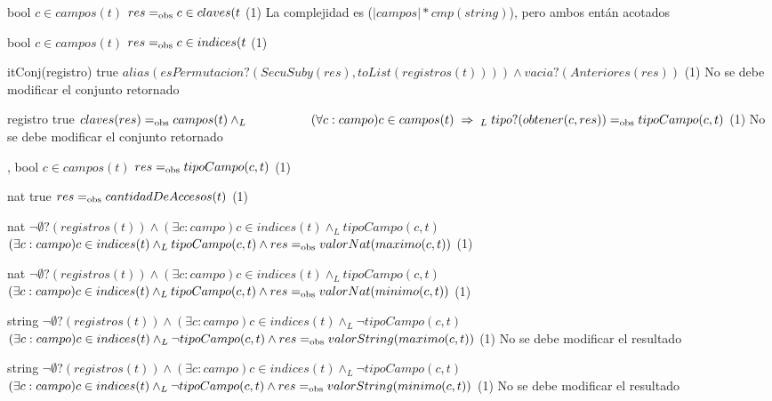 {   
    }
{bool}
{$c \in campos(t)$}
{$res =_{\mathrm{obs}} c \in claves(t$}
{\bigo(1)}
{}
{La complejidad es \bigo($|campos| * cmp(string)$), pero ambos entán acotados}

{   
    }
{bool}
{$c \in campos(t)$}
{$res =_{\mathrm{obs}} c \in indices(t$}
{\bigo(1)}
{}
{}

{   }
{itConj(registro)}
{true}
{$alias(esPermutacion?(SecuSuby(res), toList(registros(t)))) \land vacia?(Anteriores(res))$}
{\bigo(1)}
{No se debe modificar el conjunto retornado}
{}

{   }
{registro}
{true}
{$claves(res) \igobs campos(t) \land_L \\
    \hspace*{5em} (\forall c : campo) c \in campos(t) \implies_L \; tipo?(obtener(c,res)) \igobs tipoCampo(c,t)$}
{\bigo(1)}
{No se debe modificar el conjunto retornado}
{}

{   ,
    }
{bool}
{$c \in campos(t)$}
{$res =_{\mathrm{obs}} tipoCampo(c,t)$}
{\bigo(1)}
{}
{}

{   }
{nat}
{true}
{$res =_{\mathrm{obs}} cantidadDeAccesos(t)$}
{\bigo(1)}
{}
{}

{   }
{nat}
{$\neg\emptyset?(registros(t)) \land
    (\exists c : campo) c \in indices(t) \land_L tipoCampo(c,t)$}
{$(\exists c : campo) c \in indices(t) \land_L tipoCampo(c,t) \land
    res =_{\mathrm{obs}} valorNat(maximo(c,t))$}
{\bigo(1)}
{}
{}

{   }
{nat}
{$\neg\emptyset?(registros(t)) \land
    (\exists c : campo) c \in indices(t) \land_L tipoCampo(c,t)$}
{$(\exists c : campo) c \in indices(t) \land_L tipoCampo(c,t) \land
    res =_{\mathrm{obs}} valorNat(minimo(c,t))$}
{\bigo(1)}
{}
{}

{   }
{string}
{$\neg\emptyset?(registros(t)) \land
    (\exists c : campo) c \in indices(t) \land_L \neg tipoCampo(c,t)$}
{$(\exists c : campo) c \in indices(t) \land_L \neg tipoCampo(c,t) \land
    res =_{\mathrm{obs}} valorString(maximo(c,t))$}
{\bigo(1)}
{No se debe modificar el resultado}
{}

{   }
{string}
{$\neg\emptyset?(registros(t)) \land
    (\exists c : campo) c \in indices(t) \land_L \neg tipoCampo(c,t)$}
{$(\exists c : campo) c \in indices(t) \land_L \neg tipoCampo(c,t) \land
    res =_{\mathrm{obs}} valorString(minimo(c,t))$}
{\bigo(1)}
{No se debe modificar el resultado}
{}

